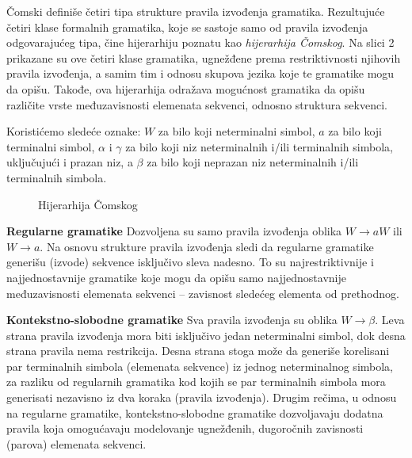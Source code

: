 \documentclass[a4paper, 12pt]{article}
\begin{document}
Čomski definiše četiri tipa strukture pravila izvođenja gramatika. Rezultujuće četiri klase formalnih gramatika, koje se sastoje samo od pravila izvođenja odgovarajućeg tipa, čine hijerarhiju poznatu kao \textit{hijerarhija Čomskog}. Na slici 2 prikazane su ove četiri klase gramatika, ugnežđene prema restriktivnosti njihovih pravila izvođenja, a samim tim i odnosu skupova jezika koje te gramatike mogu da opišu. Takođe, ova hijerarhija odražava mogućnost gramatika da opišu različite vrste međuzavisnosti elemenata sekvenci, odnosno struktura sekvenci.

Koristićemo sledeće oznake: $W$ za bilo koji neterminalni simbol, $a$ za bilo koji terminalni simbol, $\alpha$ i $\gamma$ za bilo koji niz neterminalnih i/ili terminalnih simbola, uključujući i prazan niz, a $\beta$ za bilo koji neprazan niz neterminalnih i/ili terminalnih simbola.

\begin{figure}[h!]
    \centering
    \vspace{0.15cm}
    \caption{Hijerarhija Čomskog}
    \vspace{0.15cm}
\end{figure}

\noindent \textbf{Regularne gramatike} \hspace{0.3cm} Dozvoljena su samo pravila izvođenja oblika $W \rightarrow aW$ ili $W \rightarrow a$. Na osnovu strukture pravila izvođenja sledi da regularne gramatike generišu (izvode) sekvence isključivo sleva nadesno. To su najrestriktivnije i najjednostavnije gramatike koje mogu da opišu samo najjednostavnije međuzavisnosti elemenata sekvenci -- zavisnost sledećeg elementa od prethodnog. 

\vspace*{0.2cm}
\noindent \textbf{Kontekstno-slobodne gramatike} \hspace{0.3cm} Sva pravila izvođenja su oblika $W \rightarrow \beta$. Leva strana pravila izvođenja mora biti isključivo jedan neterminalni simbol, dok desna strana pravila nema restrikcija. Desna strana stoga može da generiše korelisani par terminalnih simbola (elemenata sekvence) iz jednog neterminalnog simbola, za razliku od regularnih gramatika kod kojih se par terminalnih simbola mora generisati nezavisno iz dva koraka (pravila izvođenja). Drugim rečima, u odnosu na regularne gramatike, kontekstno-slobodne gramatike dozvoljavaju dodatna pravila koja omogućavaju modelovanje ugnežđenih, dugoročnih zavisnosti (parova) elemenata sekvenci.
\end{document}
